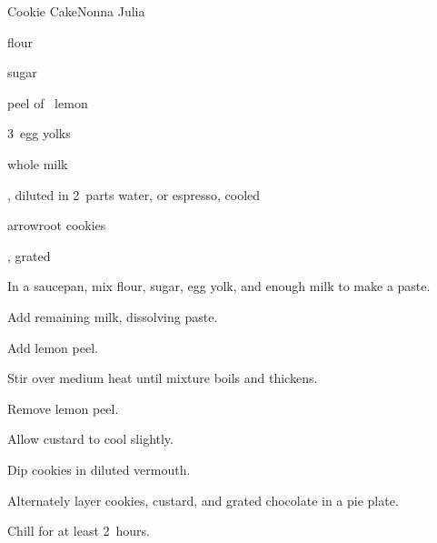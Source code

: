 \begin{recipe}{Cookie Cake}{Nonna Julia}{}

\begin{ingredients}
\item {} flour
\item \C{\half} sugar
\item peel of \threequarter{}~lemon
\item 3~egg yolks
\item {} whole milk
\item {}, diluted in 2~parts water, or espresso, cooled
\item arrowroot cookies
\item {}, grated
\end{ingredients}

\begin{directions}
\item In a saucepan, mix flour, sugar, egg yolk, and enough milk to make a paste.
\item Add remaining milk, dissolving paste.
\item Add lemon peel.
\item Stir over medium heat until mixture boils and thickens.
\item Remove lemon peel.
\item Allow custard to cool slightly.
\item Dip cookies in diluted vermouth.
\item Alternately layer cookies, custard, and grated chocolate in a pie plate.
\item Chill for at least 2~hours.
\end{directions}

\end{recipe}

